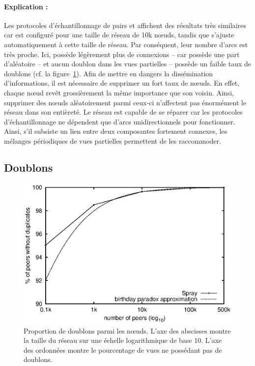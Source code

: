 \paragraph{Explication :} Les protocoles d'échantillonnage de pairs \CYCLON et
\SPRAY affichent des résultats très similaires car \CYCLON est configuré pour
une taille de réseau de 10k nœuds, tandis que \SPRAY s'ajuste automatiquement à
cette taille de réseau. Par conséquent, leur nombre d'arcs est très proche. Ici,
\CYCLON possède légèrement plus de connexions -- car \SPRAY possède une part
d'aléatoire -- et aucun doublon dans les vues partielles -- \SPRAY possède un
faible taux de doublons (cf. la figure~\ref{net:fig:duplicates}). Afin de mettre
en dangers la dissémination d'informations, il est nécessaire de supprimer un
fort taux de nœuds. En effet, chaque nœud revêt grossièrement la même importance
que son voisin. Ainsi, supprimer des nœuds aléatoirement parmi ceux-ci
n'affectent pas énormément le réseau dans son entièreté. Le réseau est capable
de se réparer car les protocoles d'échantillonnage ne dépendent que d'arcs
unidirectionnels pour fonctionner. Ainsi, s'il subsiste un lien entre deux
composantes fortement connexes, les mélanges périodiques de vues partielles
permettent de les raccommoder.


\subsection{Doublons}
\label{net:subsec:duplicates}

\begin{figure}
  \centering
  \includegraphics[width=.8\textwidth]{img/spray/duplicates.eps}
  \caption{\label{net:fig:duplicates} Proportion de doublons parmi les nœuds.
    L'axe des abscisses montre la taille du réseau sur une échelle logarithmique
    de base 10. L'axe des ordonnées montre le pourcentage de vues ne possédant
    pas de doublons.}
\end{figure}

